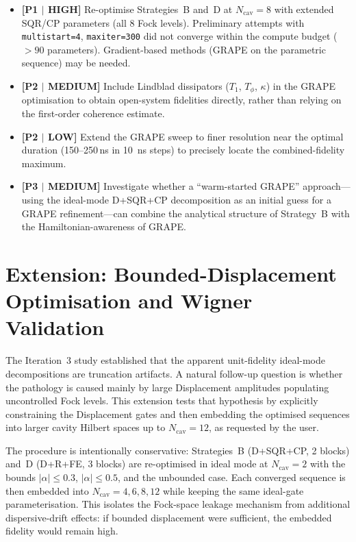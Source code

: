 \documentclass[aps,pra,twocolumn,reprint,floatfix,amsmath,amssymb]{revtex4-2}
\begin{document}
\begin{itemize}
  \item \textbf{[P1 $|$ HIGH]} Re-optimise Strategies~B and~D at
    $N_\mathrm{cav}=8$ with extended SQR/CP parameters (all 8 Fock
    levels).  Preliminary attempts with \texttt{multistart=4},
    \texttt{maxiter=300} did not converge within the compute budget
    ($>90$ parameters).  Gradient-based methods (GRAPE on the
    parametric sequence) may be needed.

  \item \textbf{[P2 $|$ MEDIUM]} Include Lindblad dissipators
    ($T_1$, $T_\phi$, $\kappa$) in the GRAPE optimisation to
    obtain open-system fidelities directly, rather than relying
    on the first-order coherence estimate.

  \item \textbf{[P2 $|$ LOW]} Extend the GRAPE sweep to finer
    resolution near the optimal duration (150--250\,ns in
    \SI{10}{ns} steps) to precisely locate the combined-fidelity
    maximum.

  \item \textbf{[P3 $|$ MEDIUM]} Investigate whether a
    ``warm-started GRAPE'' approach---using the ideal-mode
    D+SQR+CP decomposition as an initial guess for a GRAPE
    refinement---can combine the analytical structure of
    Strategy~B with the Hamiltonian-awareness of GRAPE.
\end{itemize}

\section{Extension: Bounded-Displacement Optimisation and Wigner Validation}
\label{sec:ext_iter4}

The Iteration~3 study established that the apparent unit-fidelity
ideal-mode decompositions are truncation artifacts.  A natural
follow-up question is whether the pathology is caused mainly by
large Displacement amplitudes populating uncontrolled Fock levels.
This extension tests that hypothesis by explicitly constraining the
Displacement gates and then embedding the optimised sequences into
larger cavity Hilbert spaces up to $N_\mathrm{cav}=12$, as requested
by the user.

The procedure is intentionally conservative: Strategies~B
(D+SQR+CP, 2 blocks) and~D (D+R+FE, 3 blocks) are re-optimised in
ideal mode at $N_\mathrm{cav}=2$ with the bounds
$|\alpha|\leq 0.3$, $|\alpha|\leq 0.5$, and the unbounded case.
Each converged sequence is then embedded into
$N_\mathrm{cav}=4,6,8,12$ while keeping the same ideal-gate
parameterisation.  This isolates the Fock-space leakage mechanism
from additional dispersive-drift effects: if bounded displacement
were sufficient, the embedded fidelity would remain high.
\end{document}
